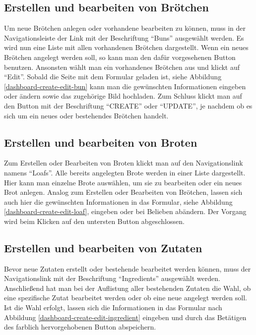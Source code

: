 \clearpage

\subsection{Erstellen und bearbeiten von Brötchen}
Um neue Brötchen anlegen oder vorhandene bearbeiten zu können, muss in der Navigationsleiste der Link mit der Beschriftung \enquote{Buns} ausgewählt werden. Es wird nun eine Liste mit allen vorhandenen Brötchen dargestellt. Wenn ein neues Brötchen angelegt werden soll, so kann man den dafür vorgesehenen Button benutzen. Ansonsten wählt man ein vorhandenes Brötchen aus und klickt auf \enquote{Edit}. Sobald die Seite mit dem Formular geladen ist, siehe Abbildung \ref{dashboard-create-edit-bun} kann man die gewünschten Informationen eingeben oder ändern sowie das zugehörige Bild hochladen. Zum Schluss klickt man auf den Button mit der Beschriftung \enquote{CREATE} oder \enquote{UPDATE}, je nachdem ob es sich um ein neues oder bestehendes Brötchen handelt.


\clearpage

\subsection{Erstellen und bearbeiten von Broten}
Zum Erstellen oder Bearbeiten von Broten klickt man auf den Navigationslink namens \enquote{Loafs}. Alle bereits angelegten Brote werden in einer Liste dargestellt. Hier kann man einzelne Brote auswählen, um sie zu bearbeiten oder ein neues Brot anlegen. Analog zum Erstellen oder Bearbeiten von Brötchen, lassen sich auch hier die gewünschten Informationen in das Formular, siehe Abbildung \ref{dashboard-create-edit-loaf}, eingeben oder bei Belieben abändern. Der Vorgang wird beim Klicken auf den untersten Button abgeschlossen.


\clearpage

\subsection{Erstellen und bearbeiten von Zutaten}
Bevor neue Zutaten erstellt oder bestehende bearbeitet werden können, muss der Navigationslink mit der Beschriftung \enquote{Ingredients} ausgewählt werden. Anschließend hat man bei der Auflistung aller bestehenden Zutaten die Wahl, ob eine spezifische Zutat bearbeitet werden oder ob eine neue angelegt werden soll. Ist die Wahl erfolgt, lassen sich die Informationen in das Formular nach Abbildung \ref{dashboard-create-edit-ingredient} eingeben und durch das Betätigen des farblich hervorgehobenen Button abspeichern.

